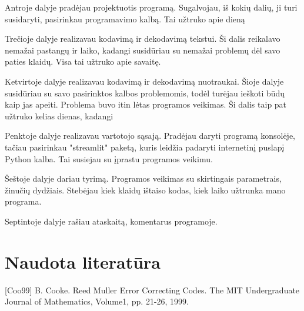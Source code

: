 \documentclass{article}
\begin{document}
Antroje dalyje pradėjau projektuotis programą. Sugalvojau, iš kokių dalių, ji turi susidaryti, pasirinkau programavimo kalbą. Tai užtruko apie dieną

Trečioje dalyje realizavau kodavimą ir dekodavimą tekstui. Ši dalis reikalavo nemažai pastangų ir laiko, kadangi susidūriau su nemažai problemų dėl savo paties klaidų. Visa tai užtruko apie savaitę.

Ketvirtoje dalyje realizavau kodavimą ir dekodavimą nuotraukai. Šioje dalyje susidūriau su savo pasirinktos kalbos problemomis, todėl turėjau ieškoti būdų kaip jas apeiti. Problema buvo itin lėtas programos veikimas. Ši dalis taip pat užtruko kelias dienas, kadangi 

Penktoje dalyje realizavau vartotojo sąsają. Pradėjau daryti programą konsolėje, tačiau pasirinkau "streamlit" paketą, kuris leidžia padaryti internetinį puslapį Python kalba. Tai susiejau su įprastu programos veikimu.

Šeštoje dalyje dariau tyrimą. Programos veikimas su skirtingais parametrais, žinučių dydžiais. Stebėjau kiek klaidų ištaiso kodas, kiek laiko užtrunka mano programa.

Septintoje dalyje rašiau ataskaitą, komentarus programoje.

\section{Naudota literatūra}
[Coo99] B. Cooke. Reed Muller Error Correcting Codes. The MIT Undergraduate Journal of Mathematics, Volume1, pp. 21-26, 1999.
\end{document}
